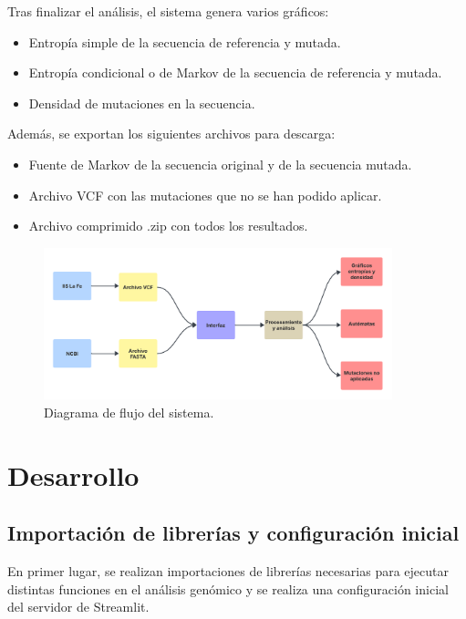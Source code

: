 \documentclass[11pt,spanish,listoffigures,listoftables]{tfgetsinf}
\begin{document}
Tras finalizar el análisis, el sistema genera varios gráficos: 

\begin{itemize}
   \item Entropía simple de la secuencia de referencia y mutada. 
   \item Entropía condicional o de Markov de la secuencia de referencia y mutada. 
   \item Densidad de mutaciones en la secuencia. 
\end{itemize}

Además, se exportan los siguientes archivos para descarga: 
   \begin{itemize}
   \item Fuente de Markov de la secuencia original y de la secuencia mutada. 
   \item Archivo \acs{VCF} con las mutaciones que no se han podido aplicar. 
   \item Archivo comprimido .zip con todos los resultados. 
\end{itemize}

\begin{figure}[H]
      \centering
      \includegraphics[width=0.9\textwidth]{Diagramas de flujo.png}
      \caption{Diagrama de flujo del sistema.}
      \label{fig:etiqueta_opcional5}
   \end{figure}



\chapter{Desarrollo}

\section{Importación de librerías y configuración inicial }

En primer lugar, se realizan importaciones de librerías necesarias para ejecutar distintas funciones en el análisis genómico y se realiza una configuración inicial del servidor de Streamlit. 
\end{document}
